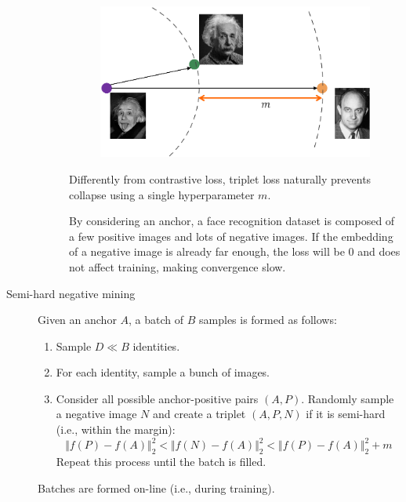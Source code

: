 \begin{description}
\begin{description}
                \begin{figure}[H]
                    \centering
                    \includegraphics[width=0.45\linewidth]{./img/_triplet_loss.pdf}
                \end{figure}

                \begin{remark}
                    Differently from contrastive loss, triplet loss naturally prevents collapse using a single hyperparameter $m$.
                \end{remark}

                \begin{remark}
                    By considering an anchor, a face recognition dataset is composed of a few positive images and lots of negative images. If the embedding of a negative image is already far enough, the loss will be $0$ and does not affect training, making convergence slow.
                \end{remark}
        \end{description}

    \item[Semi-hard negative mining] 
        Given an anchor $A$, a batch of $B$ samples is formed as follows:
        \begin{enumerate}
            \item Sample $D \ll B$ identities.
            \item For each identity, sample a bunch of images.
            \item Consider all possible anchor-positive pairs $(A, P)$. Randomly sample a negative image $N$ and create a triplet $(A, P, N)$ if it is semi-hard (i.e., within the margin):
            \[ \Vert f(P) - f(A) \Vert_2^2 < \Vert f(N) - f(A) \Vert_2^2 < \Vert f(P) - f(A) \Vert_2^2 + m \]
            Repeat this process until the batch is filled.
        \end{enumerate}

        \begin{remark}
            Batches are formed on-line (i.e., during training).
        \end{remark}


\end{description}
